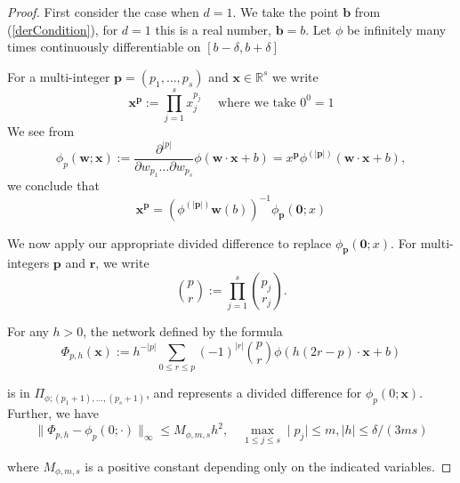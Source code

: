 \documentclass[11pt,a4paper]{article}
\theoremstyle{plain}
\theoremstyle{definition}
\theoremstyle{remark}
\begin{document}
\begin{proof}
    
First consider the case when \(d = 1\). We take the point \(\mathbf{b} \) from (\ref{derCondition}), for \(d = 1\) this is a real number, \(\mathbf{b} = b \).
Let \(\phi \) be infinitely many times continuously differentiable on \([b-\delta ,b+\delta ]\)

For a multi-integer \(\mathbf{p} = (p_1, \ldots , p_{s} )\) and \(\mathbf{x} \in \mathbb{R}^s\) we write 
\begin{equation}
    \mathbf{x}^{\mathbf{p} } := \prod_{j=1}^{s} x_{j}^{p_{j}} \quad \text{ where we take } 0^0 = 1
\end{equation}
We see from
\begin{equation}
    \phi_{p}(\mathbf{w}; \mathbf{x}) := \frac{\partial^{|p|}}{\partial w_{p_1} \dots \partial w_{p_s}} \phi(\mathbf{w} \cdot \mathbf{x} + b) = x^{\mathbf{p} } \phi^{(|\mathbf{p}|)}(\mathbf{w} \cdot \mathbf{x} + b),
\end{equation}
we conclude that
\begin{equation}
    \mathbf{x}^{\mathbf{p} } = \left(
        \phi^{(|\mathbf{p}|)}\mathbf{w} (b)
        \right)^{-1} \phi_{\mathbf{p} }(\textbf{0} ; x)
\end{equation}

We now apply our appropriate divided difference to replace \(\phi_{\mathbf{p} }(\textbf{0} ; x)\).
For multi-integers \(\mathbf{p}\) and \(\mathbf{r} \), we write
\begin{equation}
    \binom{p}{r} := \prod_{j=1}^{s} \binom{p_j}{r_j}.
\end{equation}

For any \( h > 0 \), the network defined by the formula
\begin{equation}
    \Phi_{p,h}(\mathbf{x}) := h^{-|p|} \sum_{0 \leq r \leq p} (-1)^{|r|} \binom{p}{r} \phi(h(2r - p) \cdot \mathbf{x} + b)
\end{equation}    

is in \( \Pi_{\phi;(p_1+1), \ldots, (p_s+1)} \), and represents a divided difference for \( \phi_{p}(0; \mathbf{x}) \). Further, we have
\begin{equation}
    \| \Phi_{p,h} - \phi_{p}(0; \cdot) \|_{\infty} \leq M_{\phi,m,s}h^2, \quad \mathop{\max}_{1 \leq j \leq s} \mid p_{j} \mid \leq m, \mid h \mid \leq \delta / (3ms)
\end{equation}

where \( M_{\phi,m,s} \) is a positive constant depending only on the indicated variables.


\end{proof}
\end{document}
